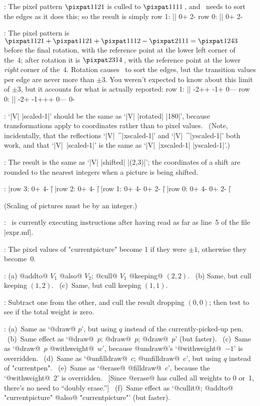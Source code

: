 :
 The pixel pattern $\pixpat1121$ is culled to $\pixpat1111\,$,
and \MF\ needs to sort the edges as it does this; so the result is simply
\begintt
row 1: || 0+ 2-
row 0: || 0+ 2-
\endtt

:
 The pixel pattern is $\pixpat1121+\pixpat1121+\pixpat1112-\pixpat2111
=\pixpat1243$ before the final rotation, with the reference point at the
lower left corner of the~4; after rotation it is $\pixpat2314\,$, with the
reference point at the lower {\sl right\/} corner of the~4. Rotation causes
\MF\ to sort the edges, but the transition values per edge are never
more than $\pm3$. You weren't expected to know about this limit of $\pm3$,
but it accounts for what is actually reported:
\begintt
row 1: || -2++ -1+ 0---
row 0: || -2+ -1+++ 0--- 0-
\endtt

:
 `|V| |scaled-1|' should be the same as `|V| |rotated| |180|',
because transformations apply to coordinates rather than to pixel values.
\ (Note, incidentally, that the reflections `|V|~^|xscaled-1|' and
`|V|~^|yscaled-1|' both work, and that `|V|~|scaled-1|' is the same as
`|V|~|xscaled-1| |yscaled-1|'.)

:
 The result is the same as `|V| |shifted| |(2,3)|'; the coordinates
of a shift are rounded to the nearest integers when a picture is being shifted.

:
 |row 3: 0+ 4- |\|\parbreak
|row 2: 0+ 4- |\|\parbreak
|row 1: 0+ 4- 0+ 2- |\|\parbreak
|row 0: 0+ 4- 0+ 2- |\|\par\nobreak
\smallskip\noindent
(Scaling of pictures must be by an integer.)

:
 \MF\ is currently executing instructions after having read
as far as line~5 of the file |expr.mf|.

:
 The pixel values of "currentpicture" become 1 if they were $\pm1$,
otherwise they become~0.

:
 (a) @addto@ $V_1$ @also@ $V_2$; @cull@ $V_1$
@keeping@ $(2,2)$. \ (b) Same, but cull keeping $(1,2)$.
\ (c)~Same, but cull keeping $(1,1)$.

:
 Subtract one from the other, and cull the result dropping $(0,0)$;
then test to see if the total weight is zero.

:
 (a)~Same as `@draw@ $p$', but using $q$ instead of the
currently-picked-up pen. \ (b)~Same effect as `@draw@~$p$; @draw@~$p$;
@draw@~$p$' (but faster).  \ (c)~Same as `@draw@~$p$ @withweight@~$w$',
because @undraw@'s `@withweight@~$-1$' is overridden.
\ (d)~Same as `@unfilldraw@~$c$; @unfilldraw@~$c$',
 but using $q$ instead of "currentpen".
\ (e)~Same as `@erase@ @filldraw@~$c$', because the `@withweight@~2' is
overridden. \ [Since @erase@ has culled all weights to 0 or~1, there's
no need to ``doubly erase.'']
\ (f)~Same effect as `@cullit@; @addto@ "currentpicture" @also@
"currentpicture"' (but faster).

